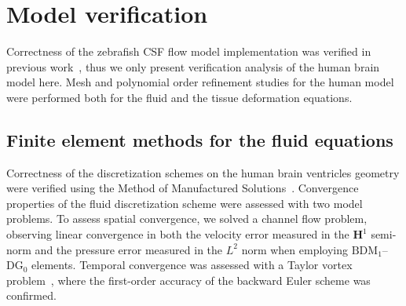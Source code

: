 \documentclass{template}
\begin{document}


\section{Model verification}
Correctness of the zebrafish CSF flow model implementation
was verified in previous work~\cite{Herlyng2025AdvectionDiffusion},
thus we only present verification analysis of the human brain model here.
Mesh and polynomial order refinement studies for the human
model were performed both for the fluid and the tissue deformation equations.

\subsection{Finite element methods for the fluid equations}
Correctness of the discretization schemes on the human brain ventricles geometry
were verified using the Method of Manufactured Solutions~\cite{Roache2001CodeSolutions}.
Convergence properties of the fluid discretization scheme were assessed with two
model problems. To assess spatial convergence, we solved a channel flow
problem, observing linear convergence in both the velocity error measured
in the $\bm{H}^1$ semi-norm and the pressure error measured in the $L^2$ norm
when employing $\mathrm{BDM}_1$--$\mathrm{DG}_0$ elements.
Temporal convergence was assessed with a Taylor vortex
problem~\cite{Karniadakis2005Verification}, where the first-order
accuracy of the backward Euler scheme was confirmed.
\end{document}
